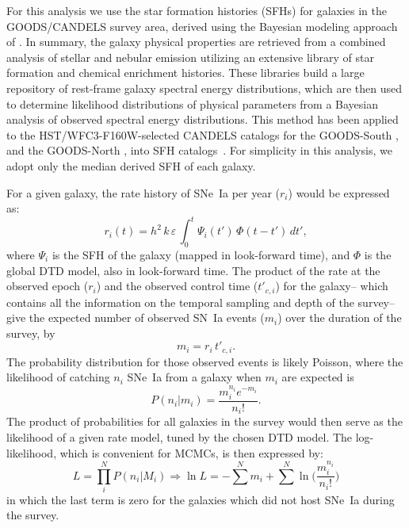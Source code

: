 \documentclass[apj, linenumbers]{aastex62}
\begin{document}
For this analysis we use the star formation histories (SFHs) for galaxies in the GOODS/CANDELS survey area, derived using the Bayesian modeling approach of \cite{Pacifici:2012ve}. In summary, the galaxy physical properties are retrieved from a combined analysis of stellar and nebular emission utilizing an extensive library of star formation and chemical enrichment histories. These libraries build a large repository of rest-frame galaxy spectral energy distributions, which are then used to determine likelihood distributions of physical parameters from a Bayesian analysis of observed spectral energy distributions. This method has been applied to the HST/WFC3-F160W-selected CANDELS catalogs for the GOODS-South \citep{Guo:2013rp}, and the GOODS-North \citep{Barro:2019vn}, into SFH catalogs~\cite[see][]{Pacifici:2016ul}. For simplicity in this analysis, we adopt only the median derived SFH of each galaxy.

For a given galaxy, the rate history of SNe~Ia per year ($r_i$) would be expressed as:
\begin{equation}
r_i (t) = h^2\,k\,\varepsilon\, \int_0^t \Psi_i(t')\,\Phi(t-t')\,dt',
\label{eqn:rate_history}
\end{equation}
\noindent where $\Psi_i$ is the SFH of the galaxy (mapped in look-forward time), and $\Phi$ is the global DTD model, also in look-forward time. The product of the rate at the observed epoch ($r_i$) and the observed control time ($t'_{c, i}$) for the galaxy-- which contains all the information on the temporal sampling and depth of the survey--  give the expected number of observed SN~Ia events ($m_i$) over the duration of the survey, by
\begin{equation}
m_i = r_i \, t'_{c, i}.
\end{equation}
\noindent The probability distribution for those observed events is likely Poisson, where the likelihood of catching $n_i$ SNe~Ia from a galaxy when $m_i$ are expected is
\begin{equation}
P(n_i | m_i) = \frac{m_i^{n_i}e^{-m_i}}{n_i!}.
\end{equation}
\noindent The product of probabilities for all galaxies in the survey would then serve as the likelihood of a given rate model, tuned by the chosen DTD model. The log-likelihood, which is convenient for MCMCs, is then expressed by:
\begin{equation}
L = \prod _i^N P(n_i|M_i) \Rightarrow \ln L = -\sum^N m_i+\sum^N\ln\biggl(\frac{m_i^{n_i}}{n_i!}\biggr)
\end{equation}
\noindent in which the last term is zero for the galaxies which did not host SNe~Ia during the survey.
\end{document}
